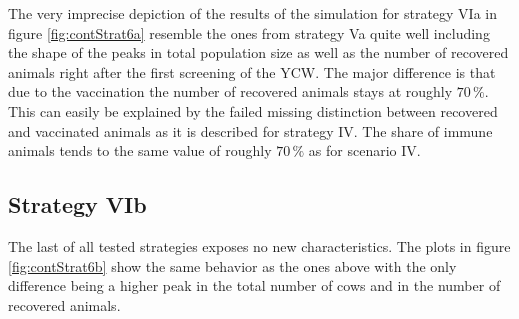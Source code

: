 The very imprecise depiction of the results of the simulation for strategy VIa in figure \ref{fig:contStrat6a} resemble the ones from strategy Va quite well including the shape of the peaks in total population size as well as the number of recovered animals right after the first screening of the YCW. The major difference is that due to the vaccination the number of recovered animals stays at roughly $70\,\%$. This can easily be explained by the failed missing distinction between recovered and vaccinated animals as it is described for strategy IV. The share of immune animals tends to the same value of roughly $70\,\%$ as for scenario IV. 
\subsection{Strategy VIb}
The last of all tested strategies exposes no new characteristics. The plots in figure \ref{fig:contStrat6b} show the same behavior as the ones above with the only difference being a higher peak in the total number of cows and in the number of recovered animals. 
